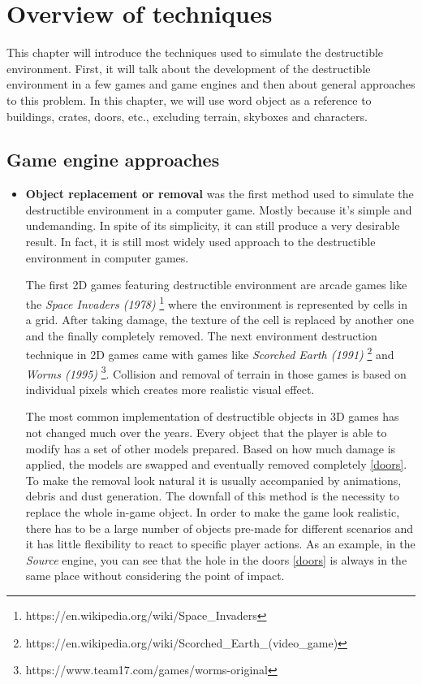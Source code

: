 \chapter{Overview of techniques}
This chapter will introduce the techniques used to simulate the destructible environment. First, it will talk about the development of the destructible environment in a few games and game engines and then about general approaches to this problem. In this chapter, we will use word object as a reference to buildings, crates, doors, etc., excluding terrain, skyboxes and characters.

\section{Game engine approaches}
\begin{itemize}
\item{\textbf{Object replacement or removal} was the first method used to simulate the destructible environment in a computer game. Mostly because it's simple and undemanding. In spite of its simplicity, it can still produce a very desirable result. In fact, it is still most widely used approach to the destructible environment in computer games.

The first 2D games featuring destructible environment are arcade games like the \emph{Space Invaders (1978)} \footnote{https://en.wikipedia.org/wiki/Space\_Invaders} where the environment is represented by cells in a grid. After taking damage, the texture of the cell is replaced by another one and the finally completely removed. The next environment destruction technique in 2D games came with games like \emph{Scorched Earth (1991)} \footnote{https://en.wikipedia.org/wiki/Scorched\_Earth\_(video\_game)} and \emph{Worms (1995)} \footnote{https://www.team17.com/games/worms-original}. Collision and removal of terrain in those games is based on individual pixels which creates more realistic visual effect.

The most common implementation of destructible objects in 3D games has not changed much over the years. Every object that the player is able to modify has a set of other models prepared. Based on how much damage is applied, the models are swapped and eventually removed completely \ref{doors}. To make the removal look natural it is usually accompanied by animations, debris and dust generation. The downfall of this method is the necessity to replace the whole in-game object. In order to make the game look realistic, there has to be a large number of objects pre-made for different scenarios and it has little flexibility to react to specific player actions. As an example, in the \emph{Source} engine, you can see that the hole in the doors \ref{doors} is always in the same place without considering the point of impact.
}


\end{itemize}
